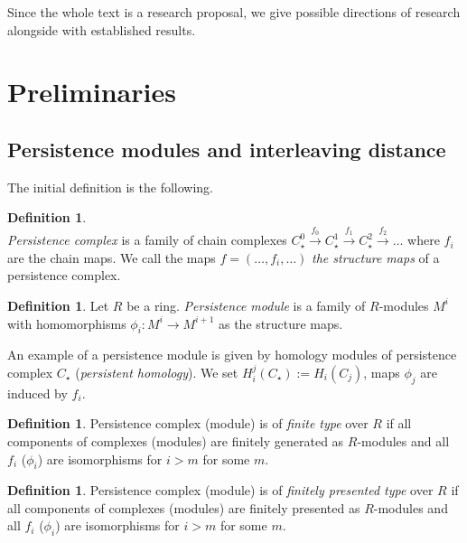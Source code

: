 \documentclass[a4paper, 12pt]{article}
\newcounter{stmcounter}[section]
\numberwithin{equation}{section}
\theoremstyle{definition}
\newtheorem{definition}[stmcounter]{Definition}
\theoremstyle{remark}
\newcommand{\define}[1]{{\textit{#1}}}
\begin{document}
Since the whole text is a research proposal, we give possible directions of research alongside with established results.

\section{Preliminaries}

\subsection{Persistence modules and interleaving distance}

The initial definition is the following.

\begin{definition} {\cite[Definition 3.1]{Zomorodian05}}\\
  \define{Persistence complex} is a family of chain complexes $C_{\star}^{0} \xrightarrow{f_0} C_{\star}^{1} \xrightarrow{f_1} C_{\star}^{2} \xrightarrow{f_2} \ldots$ where $f_i$ are the chain maps. We call the maps $f=(\ldots,f_i,\ldots)$ \define{the structure maps} of a persistence complex.
\end{definition}

\begin{definition}
  Let $R$ be a ring. \define{Persistence module} is a family of $R$-modules $M^i$ with homomorphisms $\phi_i : M^i \to M^{i+1}$ as the structure maps.
\end{definition}

An example of a persistence module is given by homology modules of persistence complex $C_{\star}$ (\define{persistent homology}). We set $H_i^j(C_{\star}) := H_i(C_{j})$, maps $\phi_j$ are induced by $f_i$.\\

\begin{definition}
  Persistence complex (module) is of \define{finite type} over $R$ if all components of complexes (modules) are finitely generated as $R$-modules and all $f_i$ ($\phi_i$) are isomorphisms for $i > m$ for some $m$.
\end{definition}

\begin{definition}
  Persistence complex (module) is of \define{finitely presented type} over $R$ if all components of complexes (modules) are finitely presented as $R$-modules and all $f_i$ ($\phi_i$) are isomorphisms for $i > m$ for some $m$.
\end{definition}
\end{document}

